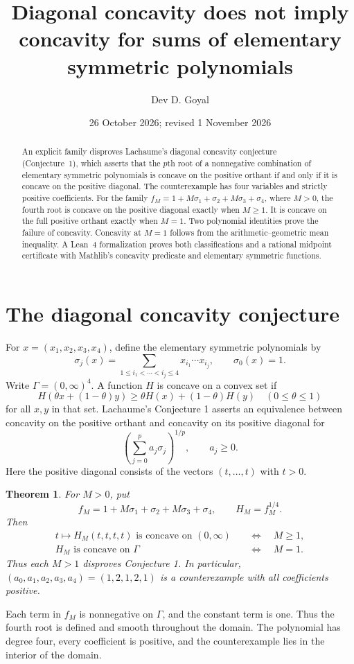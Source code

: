 \documentclass[11pt,a4paper]{article}
\title{Diagonal concavity does not imply concavity for sums of elementary symmetric polynomials}
\author{Dev D. Goyal}
\date{26 October 2026; revised 1 November 2026}
\newtheorem{theorem}{Theorem}
\begin{document}
\maketitle
\begin{abstract}
An explicit family disproves Lachaume's diagonal concavity conjecture~\cite{lachaume} (Conjecture~1), which asserts that the $p$th root of a nonnegative combination of elementary symmetric polynomials is concave on the positive orthant if and only if it is concave on the positive diagonal. The counterexample has four variables and strictly positive coefficients. For the family $f_M=1+M\sigma_1+\sigma_2+M\sigma_3+\sigma_4$, where $M>0$, the fourth root is concave on the positive diagonal exactly when $M\geq1$. It is concave on the full positive orthant exactly when $M=1$. Two polynomial identities prove the failure of concavity. Concavity at $M=1$ follows from the arithmetic--geometric mean inequality. A Lean~4 formalization proves both classifications and a rational midpoint certificate with Mathlib's concavity predicate and elementary symmetric functions.
\end{abstract}

\section{The diagonal concavity conjecture}
For $x=(x_1,x_2,x_3,x_4)$, define the elementary symmetric polynomials by
\[
 \sigma_j(x)=\sum_{1\leq i_1<\cdots<i_j\leq4}x_{i_1}\cdots x_{i_j},
 \qquad \sigma_0(x)=1.
\]
Write $\Gamma=(0,\infty)^4$. A function $H$ is concave on a convex set if
\[
 H(\theta x+(1-\theta)y)\geq\theta H(x)+(1-\theta)H(y)
 \quad(0\leq\theta\leq1)
\]
for all $x,y$ in that set.
Lachaume's Conjecture 1 \cite{lachaume} asserts an equivalence between concavity on the positive orthant and concavity on its positive diagonal for
\[
 \left(\sum_{j=0}^p a_j\sigma_j\right)^{1/p},\qquad a_j\geq0.
\]
Here the positive diagonal consists of the vectors $(t,\ldots,t)$ with $t>0$.

\begin{theorem}\label{thm:classification}
For $M>0$, put
\[
 f_M=1+M\sigma_1+\sigma_2+M\sigma_3+\sigma_4,
 \qquad H_M=f_M^{1/4}.
\]
Then
\begin{align*}
 t\longmapsto H_M(t,t,t,t)\text{ is concave on }(0,\infty)
 &\quad\Longleftrightarrow\quad M\geq1,\\
 H_M\text{ is concave on }\Gamma
 &\quad\Longleftrightarrow\quad M=1.
\end{align*}
Thus each $M>1$ disproves Conjecture 1. In particular, $(a_0,a_1,a_2,a_3,a_4)=(1,2,1,2,1)$ is a counterexample with all coefficients positive.
\end{theorem}
Each term in $f_M$ is nonnegative on $\Gamma$, and the constant term is one. Thus the fourth root is defined and smooth throughout the domain. The polynomial has degree four, every coefficient is positive, and the counterexample lies in the interior of the domain.
\end{document}
